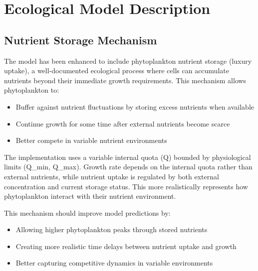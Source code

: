 \section{Ecological Model Description}

\subsection{Nutrient Storage Mechanism}

The model has been enhanced to include phytoplankton nutrient storage (luxury uptake), a well-documented ecological process where cells can accumulate nutrients beyond their immediate growth requirements. This mechanism allows phytoplankton to:

\begin{itemize}
\item Buffer against nutrient fluctuations by storing excess nutrients when available
\item Continue growth for some time after external nutrients become scarce
\item Better compete in variable nutrient environments
\end{itemize}

The implementation uses a variable internal quota (Q) bounded by physiological limits (Q_min, Q_max). Growth rate depends on the internal quota rather than external nutrients, while nutrient uptake is regulated by both external concentration and current storage status. This more realistically represents how phytoplankton interact with their nutrient environment.

This mechanism should improve model predictions by:
\begin{itemize}
\item Allowing higher phytoplankton peaks through stored nutrients
\item Creating more realistic time delays between nutrient uptake and growth
\item Better capturing competitive dynamics in variable environments
\end{itemize}
